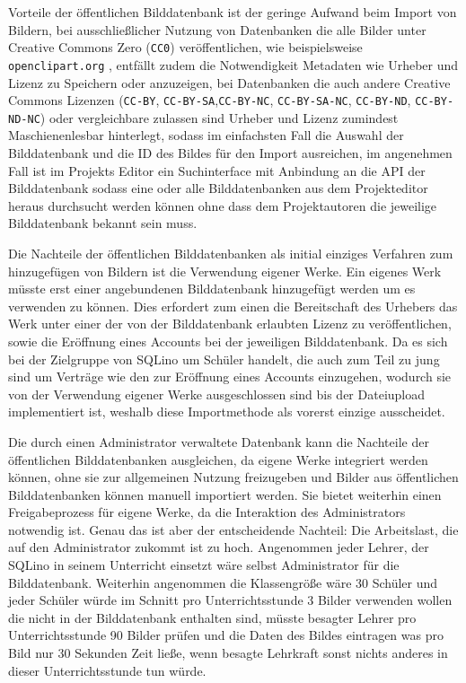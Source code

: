 Vorteile der öffentlichen Bilddatenbank ist der geringe Aufwand beim Import von
Bildern, bei ausschließlicher Nutzung von Datenbanken die alle Bilder unter
Creative Commons Zero (\texttt{CC0}) \cite{CC0} veröffentlichen, wie
beispielsweise \texttt{openclipart.org} \cite{openclipart-licence}, entfällt
zudem die Notwendigkeit Metadaten wie Urheber und Lizenz zu Speichern oder
anzuzeigen, bei Datenbanken die auch andere Creative Commons Lizenzen
(\texttt{CC-BY}, \texttt{CC-BY-SA},\texttt{CC-BY-NC}, \texttt{CC-BY-SA-NC},
\texttt{CC-BY-ND}, \texttt{CC-BY-ND-NC}) oder vergleichbare zulassen sind
Urheber und Lizenz zumindest Maschienenlesbar hinterlegt, sodass im einfachsten
Fall die Auswahl der Bilddatenbank und die ID des Bildes für den Import
ausreichen, im angenehmen Fall ist im Projekts Editor ein Suchinterface mit
Anbindung an die API der Bilddatenbank sodass eine oder alle Bilddatenbanken aus
dem Projekteditor heraus durchsucht werden können ohne dass dem Projektautoren
die jeweilige Bilddatenbank bekannt sein muss.

Die Nachteile der öffentlichen Bilddatenbanken als initial einziges Verfahren
zum hinzugefügen von Bildern ist die Verwendung eigener Werke. Ein eigenes Werk
müsste erst einer angebundenen Bilddatenbank hinzugefügt werden um es verwenden
zu können. Dies erfordert zum einen die Bereitschaft des Urhebers das Werk unter
einer der von der Bilddatenbank erlaubten Lizenz zu veröffentlichen, sowie die
Eröffnung eines Accounts bei der jeweiligen Bilddatenbank. Da es sich bei der
Zielgruppe von SQLino um Schüler handelt, die auch zum Teil zu jung sind um
Verträge wie den zur Eröffnung eines Accounts einzugehen, wodurch sie von der
Verwendung eigener Werke ausgeschlossen sind bis der Dateiupload implementiert
ist, weshalb diese Importmethode als vorerst einzige ausscheidet.

Die durch einen Administrator verwaltete Datenbank kann die Nachteile der
öffentlichen Bilddatenbanken ausgleichen, da eigene Werke integriert werden
können, ohne sie zur allgemeinen Nutzung freizugeben und Bilder aus
öffentlichen Bilddatenbanken können manuell importiert werden. Sie bietet
weiterhin einen Freigabeprozess für eigene Werke, da die Interaktion des
Administrators notwendig ist. Genau das ist aber der entscheidende Nachteil: Die
Arbeitslast, die auf den Administrator zukommt ist zu hoch. Angenommen jeder
Lehrer, der SQLino in seinem Unterricht einsetzt wäre selbst Administrator für
die Bilddatenbank. Weiterhin angenommen die Klassengröße wäre 30 Schüler und
jeder Schüler würde im Schnitt pro Unterrichtsstunde 3 Bilder verwenden wollen
die nicht in der Bilddatenbank enthalten sind, müsste besagter Lehrer pro
Unterrichtsstunde 90 Bilder prüfen und die Daten des Bildes eintragen was pro
Bild nur 30 Sekunden Zeit ließe, wenn besagte Lehrkraft sonst nichts anderes in
dieser Unterrichtsstunde tun würde.


